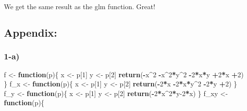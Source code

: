 \documentclass[
]{article}
\newenvironment{Shaded}{\begin{snugshade}}{\end{snugshade}}
\newcommand{\ControlFlowTok}[1]{\textcolor[rgb]{0.13,0.29,0.53}{\textbf{#1}}}
\newcommand{\DecValTok}[1]{\textcolor[rgb]{0.00,0.00,0.81}{#1}}
\newcommand{\FunctionTok}[1]{\textcolor[rgb]{0.13,0.29,0.53}{\textbf{#1}}}
\newcommand{\NormalTok}[1]{#1}
\newcommand{\OtherTok}[1]{\textcolor[rgb]{0.56,0.35,0.01}{#1}}
\newcommand{\SpecialCharTok}[1]{\textcolor[rgb]{0.81,0.36,0.00}{\textbf{#1}}}
\begin{document}
We get the same result as the glm function. Great!

\hypertarget{appendix}{%
\subsection{Appendix:}\label{appendix}}

\hypertarget{a-2}{%
\subsubsection{1-a)}\label{a-2}}

\begin{Shaded}
\begin{Highlighting}[]
\NormalTok{f }\OtherTok{\textless{}{-}} \ControlFlowTok{function}\NormalTok{(p)\{}
\NormalTok{  x }\OtherTok{\textless{}{-}}\NormalTok{ p[}\DecValTok{1}\NormalTok{]}
\NormalTok{  y }\OtherTok{\textless{}{-}}\NormalTok{ p[}\DecValTok{2}\NormalTok{]}
  \FunctionTok{return}\NormalTok{(}\SpecialCharTok{{-}}\NormalTok{x}\SpecialCharTok{\^{}}\DecValTok{2} \SpecialCharTok{{-}}\NormalTok{x}\SpecialCharTok{\^{}}\DecValTok{2}\SpecialCharTok{*}\NormalTok{y}\SpecialCharTok{\^{}}\DecValTok{2} \SpecialCharTok{{-}}\DecValTok{2}\SpecialCharTok{*}\NormalTok{x}\SpecialCharTok{*}\NormalTok{y }\SpecialCharTok{+}\DecValTok{2}\SpecialCharTok{*}\NormalTok{x }\SpecialCharTok{+}\DecValTok{2}\NormalTok{)}
\NormalTok{\}}
\NormalTok{f\_x }\OtherTok{\textless{}{-}} \ControlFlowTok{function}\NormalTok{(p)\{}
\NormalTok{  x }\OtherTok{\textless{}{-}}\NormalTok{ p[}\DecValTok{1}\NormalTok{]}
\NormalTok{  y }\OtherTok{\textless{}{-}}\NormalTok{ p[}\DecValTok{2}\NormalTok{]}
  \FunctionTok{return}\NormalTok{(}\SpecialCharTok{{-}}\DecValTok{2}\SpecialCharTok{*}\NormalTok{x }\SpecialCharTok{{-}}\DecValTok{2}\SpecialCharTok{*}\NormalTok{x}\SpecialCharTok{*}\NormalTok{y}\SpecialCharTok{\^{}}\DecValTok{2} \SpecialCharTok{{-}}\DecValTok{2}\SpecialCharTok{*}\NormalTok{y }\SpecialCharTok{+}\DecValTok{2}\NormalTok{)}
\NormalTok{\}}
\NormalTok{f\_y }\OtherTok{\textless{}{-}} \ControlFlowTok{function}\NormalTok{(p)\{}
\NormalTok{  x }\OtherTok{\textless{}{-}}\NormalTok{ p[}\DecValTok{1}\NormalTok{]}
\NormalTok{  y }\OtherTok{\textless{}{-}}\NormalTok{ p[}\DecValTok{2}\NormalTok{]}
  \FunctionTok{return}\NormalTok{(}\SpecialCharTok{{-}}\DecValTok{2}\SpecialCharTok{*}\NormalTok{x}\SpecialCharTok{\^{}}\DecValTok{2}\SpecialCharTok{*}\NormalTok{y}\DecValTok{{-}2}\SpecialCharTok{*}\NormalTok{x)}
\NormalTok{\}}
\NormalTok{f\_xy }\OtherTok{\textless{}{-}} \ControlFlowTok{function}\NormalTok{(p)\{}

\end{Highlighting}
\end{Shaded}
\end{document}
